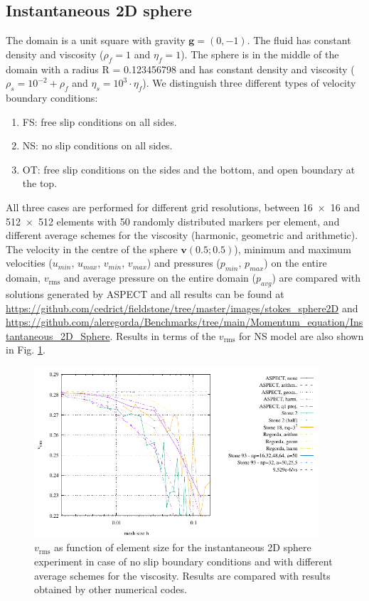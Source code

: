 \documentclass[hidelinks,10pt,a4paper]{article}
\begin{document}
\subsection{Instantaneous 2D sphere}\label{sec:ist_sphere}
The domain is a unit square with gravity $\bm{g}=(0,-1)$. The fluid has constant density and viscosity ($\rho_f=1$ and $\eta_f=1$). The sphere is in the middle
of the domain with a radius R = 0.123456798 and has constant density and viscosity ($\rho_s=10^{-2}+\rho_f$ and $\eta_s=10^3 \cdot \eta_f$).
We distinguish three different types of velocity boundary conditions:
\begin{enumerate}
\item FS: free slip conditions on all sides.
\item NS: no slip conditions on all sides.
\item OT: free slip conditions on the sides and the bottom, and open boundary at the top.
\end{enumerate}
All three cases are performed for different grid resolutions, between \num{16x16} and \num{512x512} elements with 50 randomly distributed markers per element,
and different average schemes for the viscosity (harmonic, geometric and arithmetic). The velocity in the centre of the sphere $\bm{v}(0.5;0.5)$), minimum and
maximum velocities ($u_{min}$, $u_{max}$, $v_{min}$, $v_{max}$) and pressures ($p_{min}$, $p_{max}$) on the entire domain, $v_{\textrm{rms}}$ and average pressure on the
entire domain ($p_{avg}$) are compared with solutions generated by ASPECT \citep{KHB12,heister_aspect_methods2,aspect-doi-v2.2.0,aspectmanual} and all results
can be found at \url{https://github.com/cedrict/fieldstone/tree/master/images/stokes_sphere2D} and 
\url{https://github.com/aleregorda/Benchmarks/tree/main/Momentum_equation/Instantaneous_2D_Sphere}. Results in terms of the $v_{\textrm{rms}}$ for NS model 
are also shown in Fig. \ref{fig:inst_sphere}.

\begin{figure}
\centering
\noindent\includegraphics[width=400px]{./Figures/vrms_NS.pdf}
\caption{$v_{\textrm{rms}}$ as function of element size for the instantaneous 2D sphere experiment in case of no slip boundary conditions and with different average
schemes for the viscosity. Results are compared with results obtained by other numerical codes.}
\label{fig:inst_sphere}
\end{figure}
\end{document}
